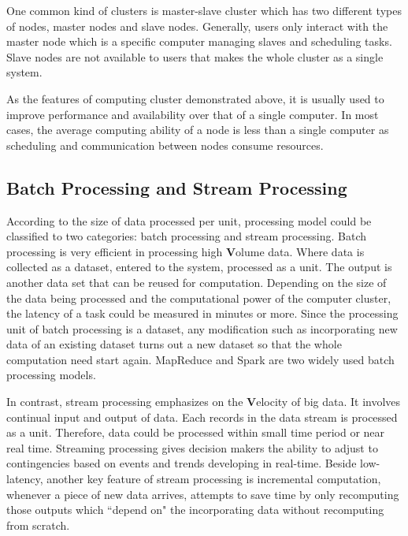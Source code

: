 One common kind of clusters is master-slave cluster which has two different types of nodes, master nodes and slave nodes. Generally, users only interact with the master node which is a specific computer managing slaves and scheduling tasks. Slave nodes are not available to users that makes the whole cluster as a single system.

As the features of computing cluster demonstrated above, it is usually used to improve performance and availability over that of a single computer. In most cases, the average computing ability of a node is less than a single computer as scheduling and communication between nodes consume resources.

\subsection{Batch Processing and Stream Processing}
According to the size of data processed per unit, processing model could be classified to two categories: batch processing and stream processing. Batch processing is very efficient in processing high \textbf{V}olume data. Where data is collected as a dataset, entered to the system, processed as a unit.  The output is another data set that can be reused for computation. Depending on the size of the data being processed and the computational power of the computer cluster, the latency of a task could be measured in minutes or more. Since the processing unit of batch processing is a dataset, any modification such as incorporating new data of an existing dataset turns out a new dataset so that the whole computation need start again. MapReduce and Spark are two widely used batch processing models.
 
In contrast, stream processing emphasizes on the \textbf{V}elocity of big data. It involves continual input and output of data. Each records in the data stream is processed as a unit. Therefore, data could be processed within small time period or near real time. Streaming processing gives decision makers the ability to adjust to contingencies based on events and trends developing in real-time. Beside low-latency, another key feature of stream processing is incremental computation, whenever a piece of new data arrives, attempts to save time by only recomputing those outputs which ``depend on" the incorporating data without recomputing from scratch.

